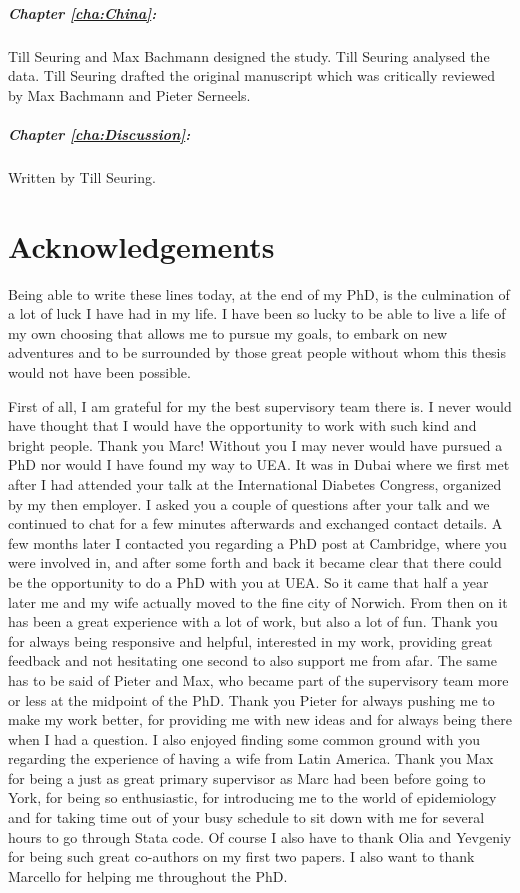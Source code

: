\paragraph{Chapter \ref{cha:China}:} Till Seuring and Max Bachmann designed the study. Till Seuring analysed the data. Till Seuring drafted the original manuscript which was critically reviewed by Max Bachmann and Pieter Serneels.

\paragraph{Chapter \ref{cha:Discussion}:} Written by Till Seuring.
\cleardoublepage

\chapter*{\label{acknowledgements}Acknowledgements}

Being able to write these lines today, at the end of my PhD, is the culmination of a lot of luck I have had in my life. I have been so lucky to be able to live a life of my own choosing that allows me to pursue my goals, to embark on new adventures and to be surrounded by those great people without whom this thesis would not have been possible. 

First of all, I am grateful for my the best supervisory team there is. I never would have thought that I would have the opportunity to work with such kind and bright people. Thank you Marc! Without you I may never would have pursued a PhD nor would I have found my way to UEA. It was in Dubai where we first met after I had attended your talk at the International Diabetes Congress, organized by my then employer. I asked you a couple of questions after your talk and we continued to chat for a few minutes afterwards and exchanged contact details. A few months later I contacted you regarding a PhD post at Cambridge, where you were involved in, and after some forth and back it became clear that there could be the opportunity to do a PhD with you at UEA. So it came that half a year later me and my wife actually moved to the fine city of Norwich. From then on it has been a great experience with a lot of work, but also a lot of fun. Thank you for always being responsive and helpful, interested in my work, providing great feedback and not hesitating one second to also support me from afar. The same has to be said of Pieter and Max, who became part of the supervisory team more or less at the midpoint of the PhD. Thank you Pieter for always pushing me to make my work better, for providing me with new ideas and for always being there when I had a question. I also enjoyed finding some common ground with you regarding the experience of having a wife from Latin America. Thank you Max for being a just as great primary supervisor as Marc had been before going to York, for being so enthusiastic, for introducing me to the world of epidemiology and for taking time out of your busy schedule to sit down with me for several hours to go through Stata code. Of course I also have to thank Olia and Yevgeniy for being such great co-authors on my first two papers. I also want to thank Marcello for helping me throughout the PhD.

